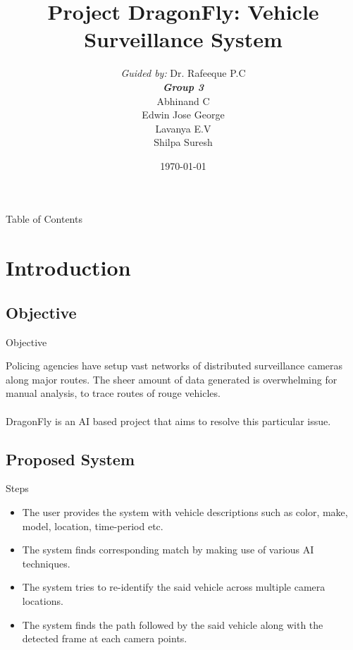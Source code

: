 \documentclass{beamer}
\title[DragonFly]{Project DragonFly: Vehicle Surveillance System}
\institute[GCEK-CSE]{Department of Computer Science and Engineering \\Government College of Engineering Kannur}
\author[Group 3]{
	{\small \textit{Guided by:}} Dr. Rafeeque P.C \\
	\medskip
	{\small \textbf{\textit{Group 3}}} \\
	Abhinand C \\ Edwin Jose George \\ Lavanya E.V \\ Shilpa Suresh
}
\date{\today}
\begin{document}
	

	\begin{frame}
	\titlepage
	\end{frame}

	\begin{frame}{Table of Contents}
	\tableofcontents
	\end{frame}



	\section{Introduction}
	\subsection{Objective}
	\begin{frame}{Objective}
		
		Policing agencies have setup vast networks of distributed surveillance cameras along major routes. The sheer amount of data generated is overwhelming for manual analysis, to trace routes of rouge vehicles.\\~\\
				
		DragonFly is an AI based project that aims to resolve this particular issue. 
	\end{frame}
	
	\subsection{Proposed System}
	\begin{frame}{Steps}
		\begin{itemize}
			\item The user provides the system with vehicle descriptions such as color, make,
			model, location, time-period etc. 
			\item The system finds corresponding match by making
use of various AI techniques. 
			\item The system tries to re-identify the said vehicle across multiple camera locations.
			\item The system finds the path followed by the said vehicle
along with the detected frame at each camera points.
		\end{itemize}
	\end{frame}
	
\end{document}
